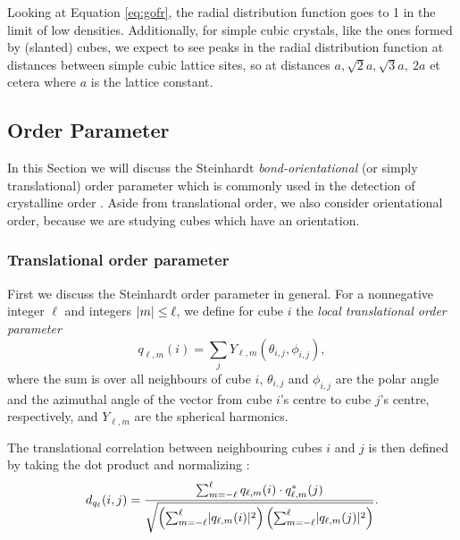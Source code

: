 \documentclass[thesis]{subfiles}
\begin{document}
Looking at Equation \ref{eq:gofr}, the radial distribution function goes to 1 in the limit of low densities. Additionally, for simple cubic crystals, like the ones formed by (slanted) cubes, we expect to see peaks in the radial distribution function at distances between simple cubic lattice sites, so at distances $a, \sqrt 2a, \sqrt 3a,\ 2a$ et cetera where $a$ is the lattice constant.

\subsection{Order Parameter} \label{subsec:order}

In this Section we will discuss the Steinhardt \emph{bond-orientational} (or simply translational) order parameter which is commonly used in the detection of crystalline order \cite{steinhardt1983bond, lechner2008accurate, van2017phase, sharma2018disorder, mickel2013shortcomings}. Aside from translational order, we also consider orientational order, because we are studying cubes which have an orientation.

\subsubsection{Translational order parameter}

First we discuss the Steinhardt order parameter in general. For a nonnegative integer $\ell$ and integers $\lvert m\rvert \leq\ell$, we define for cube $i$ the \emph{local translational order parameter} \cite{steinhardt1983bond}
\begin{equation}
q_{\ell, m}(i) = \sum_{j} Y_{\ell, m} (\theta_{i, j}, \phi_{i, j}),
\end{equation}
where the sum is over all neighbours of cube $i$, $\theta_{i, j}$ and $\phi_{i, j}$ are the polar angle and the azimuthal angle of the vector from cube $i$'s centre to cube $j$'s centre, respectively, and $Y_{\ell, m}$ are the spherical harmonics.%

The translational correlation between neighbouring cubes $i$ and $j$ is then defined by taking the dot product and normalizing \cite{sharma2018disorder}:
\begin{equation}
d_{q_\ell}(i, j) = \frac{\sum_{m = -\ell}^\ell q_{\ell, m}(i) \cdot q^*_{\ell, m}(j)}{\sqrt{\left(\sum_{m = -\ell}^\ell \lvert q_{\ell, m}(i)\rvert^2\right) \left(\sum_{m = -\ell}^\ell \lvert q_{\ell, m}(j)\rvert^2\right)}}.
\end{equation}
\end{document}
